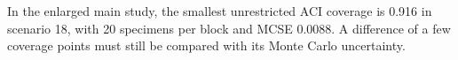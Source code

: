 In the enlarged main study, the smallest unrestricted ACI coverage is 0.916 in scenario 18, with 20 specimens per block and MCSE 0.0088. A difference of a few coverage points must still be compared with its Monte Carlo uncertainty.
